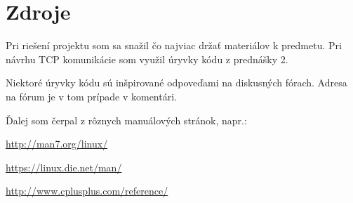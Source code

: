 \documentclass[a4paper, 11pt]{article}
\begin{document}
\section{Zdroje}
Pri riešení projektu som sa snažil čo najviac držať materiálov k predmetu. Pri návrhu TCP komunikácie som využil úryvky kódu z prednášky 2. 

Niektoré úryvky kódu sú inšpirované odpoveďami na diskusných fórach. Adresa na fórum je v tom prípade v komentári.

Ďalej som čerpal z rôznych manuálových stránok, napr.:

\url{http://man7.org/linux/}

\url{https://linux.die.net/man/}

\url{http://www.cplusplus.com/reference/}
\end{document}
